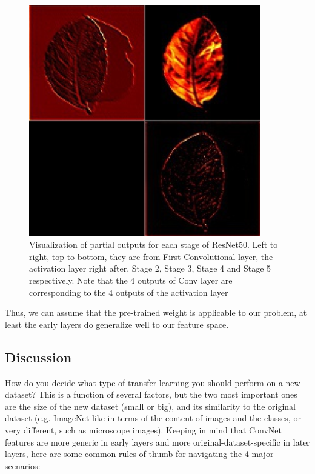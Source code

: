 \documentclass[journal, 10pt]{IEEEtran}
\begin{document}
\begin{figure}[H]
\begin{minipage}[b]{0.3\linewidth}
      \includegraphics[width=0.9\textwidth]{33214-a1.jpg}
      \vspace{4ex}
    \end{minipage}
    \caption{Visualization of partial outputs for each stage of ResNet50. Left to right, top to bottom, they are from First Convolutional layer, the activation layer right after, Stage 2, Stage 3, Stage 4 and Stage 5 respectively. Note that the 4 outputs of Conv layer are corresponding to the 4 outputs of the activation layer}
    \label{fig:visual_output}
  \end{figure}

  Thus, we can assume that the pre-trained weight is applicable to our problem, at least the early layers do generalize well to our feature space.

  \subsection{Discussion}
    How do you decide what type of transfer learning you should perform on a new dataset? This is a function of several factors, but the two most important ones are the size of the new dataset (small or big), and its similarity to the original dataset (e.g. ImageNet-like in terms of the content of images and the classes, or very different, such as microscope images). Keeping in mind that ConvNet features are more generic in early layers and more original-dataset-specific in later layers, here are some common rules of thumb for navigating the 4 major scenarios:
    \cite{CS231N}
\end{document}
